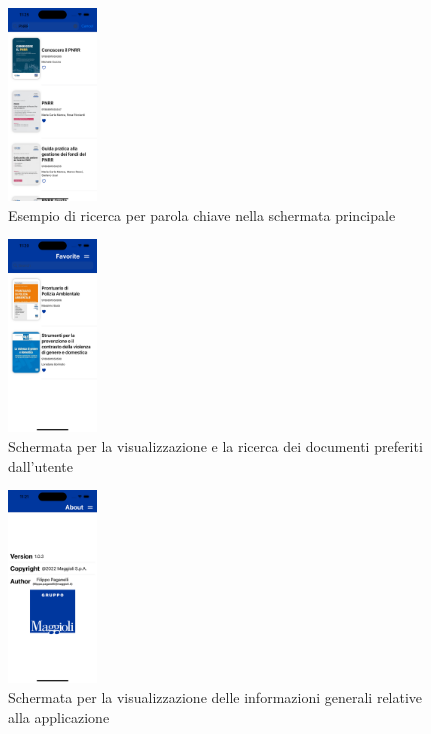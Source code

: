 \begin{multicols}{3}
            \begin{figure}[H]
                \includegraphics[width=0.21\textwidth]{img/Simulator Screen Shot - iPhone 14 Pro - 2022-10-05 at 11.25.21.png}
                \caption{Esempio di ricerca per parola chiave nella schermata principale}
                \label{ricercaios}
            \end{figure}

            \begin{figure}[H]
                \includegraphics[width=0.21\textwidth]{img/Simulator Screen Shot - iPhone 14 Pro - 2022-10-05 at 11.20.04.png}
                \caption{Schermata per la visualizzazione e la ricerca dei documenti preferiti dall'utente}
                \label{preferitiios}
            \end{figure}

            \begin{figure}[H]
                \includegraphics[width=0.21\textwidth]{img/Simulator Screen Shot - iPhone 14 Pro - 2022-10-05 at 11.21.25.png}
                \caption{Schermata per la visualizzazione delle informazioni generali relative alla applicazione}
                \label{aboutios}
            \end{figure}


\end{multicols}
